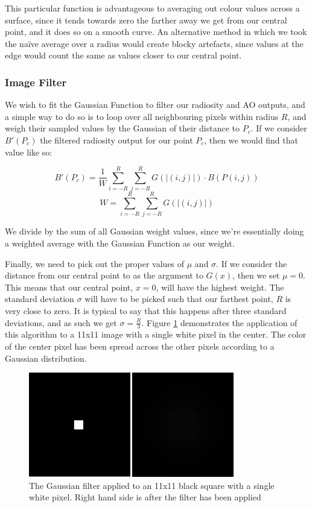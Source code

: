 This particular function is advantageous to averaging out colour values across a surface, since it tends towards zero the farther away we get from our central point, and it does so on a smooth curve. An alternative method in which we took the naïve average over a radius would create blocky artefacts, since values at the edge would count the same as values closer to our central point.

\subsubsection{Image Filter}
We wish to fit the Gaussian Function to filter our radiosity and AO outputs, and a simple way to do so is to loop over all neighbouring pixels within radius $R$, and weigh their sampled values by the Gaussian of their distance to $P_c$. If we consider $B\prime(P_c)$ the filtered radiosity output for our point $P_c$, then we would find that value like so:

$$B\prime(P_c) = \frac{1}{W} \sum_{i = -R}^{R} \sum_{j = -R}^{R} G(|(i,j)|) \cdot B(P(i,j))$$
$$W = \sum_{i = -R}^{R} \sum_{j = -R}^{R} G(|(i,j)|)$$

We divide by the sum of all Gaussian weight values, since we're essentially doing a weighted average with the Gaussian Function as our weight.

Finally, we need to pick out the proper values of $\mu$ and $\sigma$. If we consider the distance from our central point to as the argument to $G(x)$, then we set $\mu = 0$. This means that our central point, $x = 0$, will have the highest weight. The standard deviation $\sigma$ will have to be picked such that our farthest point, $R$ is very close to zero. It is typical to say that this happens after three standard deviations, and as such we get $\sigma = \frac{R}{3}$. Figure \ref{fig-gauss-applied} demonstrates the application of this algorithm to a 11x11 image with a single white pixel in the center. The color of the center pixel has been spread across the other pixels according to a Gaussian distribution.

\begin{figure}[!ht]
  \centering
    \includegraphics[width=0.8\textwidth]{img/gauss-pixel}
    \caption{The Gaussian filter applied to an 11x11 black square with a single white pixel. Right hand side is after the 									filter has been applied}
    \label{fig-gauss-applied}
\end{figure}

